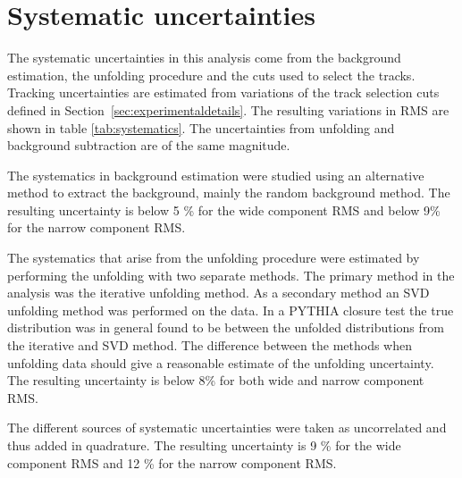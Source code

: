 %

\section{Systematic uncertainties}
\label{sec:systematicerrors}
The systematic uncertainties in this analysis come from the background estimation, the unfolding procedure and the cuts used to select the tracks. Tracking uncertainties are estimated from variations of the track selection cuts defined in Section~\ref{sec:experimentaldetails}. The resulting variations in RMS are shown in table \ref{tab:systematics}. The uncertainties from unfolding and background subtraction are of the same magnitude. 

The systematics in background estimation were studied using an alternative method to extract the background, mainly the random background method. The resulting uncertainty is below 5 \% for the wide component RMS and below 9\% for the narrow component RMS. 

The systematics that arise from the unfolding procedure were estimated by performing the unfolding with two separate methods. The primary method in the analysis was the iterative unfolding method. As a secondary method an SVD unfolding method was performed on the data. In a PYTHIA closure test the true distribution was in general found to be between the unfolded distributions from the iterative and SVD method. The difference between the methods when unfolding data should give a reasonable estimate of the unfolding uncertainty. The resulting uncertainty is below 8\% for both wide and narrow component RMS.

The different sources of systematic uncertainties were taken as uncorrelated and thus added in quadrature. The resulting uncertainty is 9 \% for the wide component RMS and 12 \% for the narrow component RMS. 

